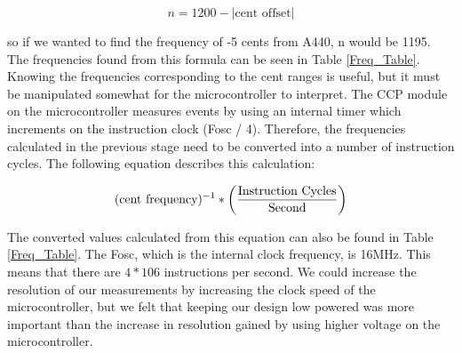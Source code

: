 \documentclass[12pt]{article}
\begin{document}
\begin{equation}
n = 1200 - |\mbox{cent offset}|
\end{equation}

so if we wanted to find the frequency of -5 cents from A440, n would be 1195. The frequencies found
from this formula can be seen in Table \ref{Freq_Table}. Knowing the frequencies corresponding to the cent ranges
is useful, but it must be manipulated somewhat for the microcontroller to interpret. The CCP module
on the microcontroller measures events by using an internal timer which increments on the instruction
clock (Fosc / 4). Therefore, the frequencies calculated in the previous stage need to be converted into a
number of instruction cycles. The following equation describes this calculation:

\begin{equation}
(\mbox{cent frequency})^{-1} * \left({ \mbox{Instruction Cycles} \over \mbox{Second}}\right)
\end{equation}

The converted values calculated from this equation can also be found in Table \ref{Freq_Table}. The Fosc, which is the
internal clock frequency, is 16MHz. This means that there are $4 *106$ instructions per second. We could
increase the resolution of our measurements by increasing the clock speed of the microcontroller, but
we felt that keeping our design low powered was more important than the increase in resolution gained
by using higher voltage on the microcontroller.
\end{document}
